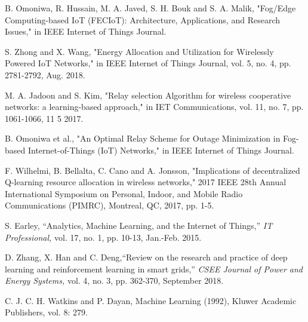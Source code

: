 \documentclass[journal]{IEEEtran}
\begin{document}
%
%
%
\begin{thebibliography}{1}

B. Omoniwa, R. Hussain, M. A. Javed, S. H. Bouk and S. A. Malik, "Fog/Edge Computing-based IoT (FECIoT): Architecture, Applications, and Research Issues," in IEEE Internet of Things Journal.

S. Zhong and X. Wang, "Energy Allocation and Utilization for Wirelessly Powered IoT Networks," in IEEE Internet of Things Journal, vol. 5, no. 4, pp. 2781-2792, Aug. 2018.

M. A. Jadoon and S. Kim, "Relay selection Algorithm for wireless cooperative networks: a learning-based approach," in IET Communications, vol. 11, no. 7, pp. 1061-1066, 11 5 2017.

B. Omoniwa et al., "An Optimal Relay Scheme for Outage Minimization in Fog-based Internet-of-Things (IoT) Networks," in IEEE Internet of Things Journal.

F. Wilhelmi, B. Bellalta, C. Cano and A. Jonsson, "Implications of decentralized Q-learning resource allocation in wireless networks," 2017 IEEE 28th Annual International Symposium on Personal, Indoor, and Mobile Radio Communications (PIMRC), Montreal, QC, 2017, pp. 1-5.

S. Earley, ``Analytics, Machine Learning, and the Internet of Things,'' \emph{IT Professional,} vol. 17, no. 1, pp. 10-13, Jan.-Feb. 2015.

D. Zhang, X. Han and C. Deng,``Review on the research and practice of deep learning and reinforcement learning in smart grids,'' \emph{CSEE Journal of Power and Energy Systems,} vol. 4, no. 3, pp. 362-370, September 2018.

C. J. C. H. Watkins and P. Dayan, Machine Learning (1992), Kluwer Academic Publishers, vol. 8: 279.


\end{thebibliography}
\end{document}
